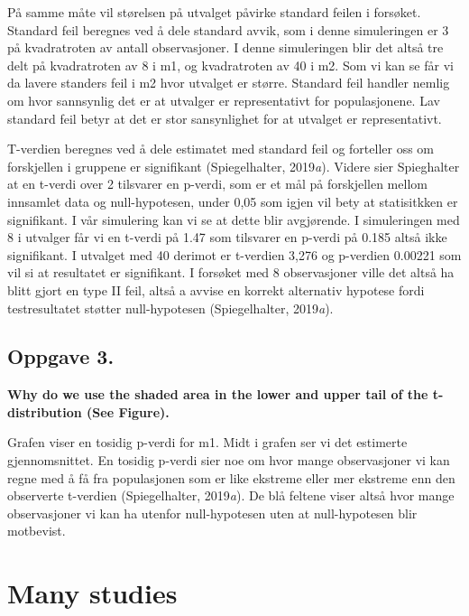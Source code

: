 \documentclass[
  letterpaper,
  DIV=11,
  numbers=noendperiod]{scrreprt}
\begin{document}
På samme måte vil størelsen på utvalget påvirke standard feilen i
forsøket. Standard feil beregnes ved å dele standard avvik, som i denne
simuleringen er 3 på kvadratroten av antall observasjoner. I denne
simuleringen blir det altså tre delt på kvadratroten av 8 i m1, og
kvadratroten av 40 i m2. Som vi kan se får vi da lavere standers feil i
m2 hvor utvalget er større. Standard feil handler nemlig om hvor
sannsynlig det er at utvalger er representativt for populasjonene. Lav
standard feil betyr at det er stor sansynlighet for at utvalget er
representativt.

T-verdien beregnes ved å dele estimatet med standard feil og forteller
oss om forskjellen i gruppene er signifikant (Spiegelhalter,
2019\emph{a}). Videre sier Spieghalter at en t-verdi over 2 tilsvarer en
p-verdi, som er et mål på forskjellen mellom innsamlet data og
null-hypotesen, under 0,05 som igjen vil bety at statisitkken er
signifikant. I vår simulering kan vi se at dette blir avgjørende. I
simuleringen med 8 i utvalger får vi en t-verdi på 1.47 som tilsvarer en
p-verdi på 0.185 altså ikke signifikant. I utvalget med 40 derimot er
t-verdien 3,276 og p-verdien 0.00221 som vil si at resultatet er
signifikant. I forsøket med 8 observasjoner ville det altså ha blitt
gjort en type II feil, altså a avvise en korrekt alternativ hypotese
fordi testresultatet støtter null-hypotesen (Spiegelhalter,
2019\emph{a}).

\subsection{Oppgave 3.}\label{oppgave-3.}

\textbf{Why do we use the shaded area in the lower and upper tail of the
t-distribution (See Figure).}

Grafen viser en tosidig p-verdi for m1. Midt i grafen ser vi det
estimerte gjennomsnittet. En tosidig p-verdi sier noe om hvor mange
observasjoner vi kan regne med å få fra populasjonen som er like
ekstreme eller mer ekstreme enn den observerte t-verdien (Spiegelhalter,
2019\emph{a}). De blå feltene viser altså hvor mange observasjoner vi
kan ha utenfor null-hypotesen uten at null-hypotesen blir motbevist.

\section{Many studies}\label{many-studies}
\end{document}
